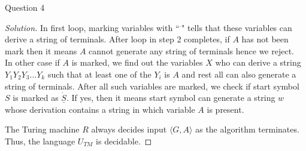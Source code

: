 \begin{solution}{Question 4}
\begin{proof}[Solution]
        In first loop, marking variables with ``$^\cdot$" tells that these variables can derive a string of terminals. After loop in step 2 completes, if $A$ has not been mark then it means $A$  cannot generate any string of terminals hence we reject.\\
        In other case if $A$ is marked, we find out the variables $X$ who can derive a string $Y_1Y_2Y_3...Y_k$ such that at least one of the $Y_i$ is $A$ and rest all can also generate a string of terminals. After all such variables are marked, we check if start symbol $S$ is marked as $\underline{\dot{S}}$. If yes, then it means start symbol can generate a string $w$ whose derivation contains a string in which variable $A$ is present.
        
        
        The Turing machine $R$ always decides input $\langle G, A\rangle$ as the algorithm terminates.
        \\
        Thus, the language $U_{TM}$ is decidable.
    \end{proof}
\end{solution}

